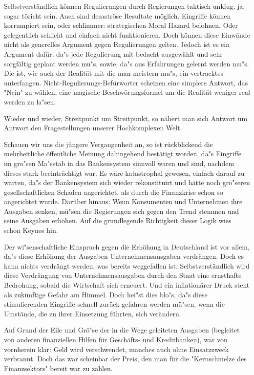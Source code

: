 \documentclass[
        onecolumn,
        a4paper,
        abstracton,
        parskip=half
        ,final
        ]{scrartcl}
\begin{document}
Selbstverst{\"a}ndlich k{\"o}nnen Regulierungen durch Regierungen taktisch unklug, ja, sogar t{\"o}richt sein. Auch sind desastr{\"o}se Resultate m{\"o}glich. Eingriffe k{\"o}nnen korrumpiert sein, oder schlimmer: strategischen Moral Hazard belohnen. Oder gelegentlich schlicht und einfach nicht funktionieren. Doch k{\"o}nnen diese Einw{\"a}nde nicht als generelles Argument gegen Regulierungen gelten. Jedoch ist es ein Argument daf{\"u}r, da{"s} jede Regulierung mit bedacht ausgew{\"a}hlt und sehr sorgf{\"a}ltig geplant werden mu{"s}, sowie, da{"s} aus Erfahrungen gelernt werden mu{"s}. Die ist, wie auch der Realit{\"a}t mit die man meistern mu{"s}, ein vertracktes unterfangen. Nicht-Regulierungs-Bef{\"u}rworter scheinen eine simplere Antwort, das "Nein" zu w{\"a}hlen, eine magische Beschw{\"o}rungsformel um die Realit{\"a}t weniger real werden zu la{"s}en.

Wieder und wieder, Streitpunkt um Streitpunkt, so n{\"a}hert man sich Antwort um Antwort den Fragestellungen unserer Hochkomplexen Welt.

Schauen wir uns die j{\"u}ngere Vergangenheit an, so ist r{\"u}ckblickend die mehrheitliche {\"o}ffentliche Meinung dahingehend best{\"a}tigt worden, da{"s} Eingriffe im gro{"s}en Ma{"s}stab in das Bankensystem sinnvoll waren und sind, nachdem dieses stark beeintr{\"a}chtigt war. Es w{\"a}re katastrophal gewesen, einfach darauf zu warten, da{"s} der Bankensystem sich wieder rekonstituirt und h{\"a}tte noch gr{\"o}{"s}eren gesellschaftlichen Schaden angerichtet, als durch die Finanzkrise schon so angerichtet wurde. Dar{\"u}ber hinaus: Wenn Konsumenten und Unternehmen ihre Ausgaben senken, m{\"u}{"s}en die Regierungen sich gegen den Trend stemmen und seine Ausgaben erh{\"o}hen. Auf die grundlegende Richtigkeit dieser Logik wies schon Keynes hin.

Der wi{"s}enschaftliche Einspruch gegen die Erh{\"o}hung in Deutschland ist vor allem, da{"s} diese Erh{\"o}hung der Ausgaben Unternehmensausgaben verdr{\"a}ngen. Doch es kann nichts verdr{\"a}ngt werden, was bereits weggefallen ist. Selbstverst{\"a}ndlich wird diese Verdr{\"a}ngung von Unternehmensausgaben durch den Staat eine ernsthafte Bedrohung, sobald die Wirtschaft sich erneuert. Und ein inflation{\"a}rer Druck steht als zuk{\"u}nftige Gefahr am Himmel. Doch hei{"s}t dies blo{"s}, da{"s} diese stimulierenden Eingriffe schnell zur{\"u}ck gefahren werden m{\"u}{"s}en, wenn die Umst{\"a}nde, die zu ihrer Einsetzung f{\"u}hrten, sich ver{\"a}ndern.

Auf Grund der Eile und Gr{\"o}{"s}e der in die Wege geleiteten Ausgaben (begleitet von anderen finanziellen Hilfen f{\"u}r Gesch{\"a}fts- und Kreditbanken), war von vornherein klar: Geld wird verschwendet, manches auch ohne Einsatzzweck verbrannt. Doch das war scheinbar der Preis, den man f{\"u}r die "Kernschmelze des Finanzsektors" bereit war zu zahlen.
\end{document}
